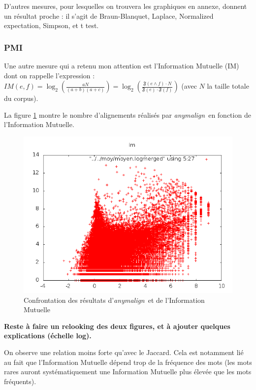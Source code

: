 \documentclass[a4paper,10pt]{article}
\newcommand{\anym}{\emph{anymalign}}
\begin{document}
D'autres mesures, pour lesquelles on trouvera les graphiques en annexe, donnent un résultat proche : il s'agit de Braun-Blanquet, Laplace, Normalized expectation, Simpson, et t test. %

\subsubsection{PMI}

Une autre mesure qui a retenu mon attention est l'Information Mutuelle (IM) %
 dont on rappelle l'expression : $IM(e,f)=\log_2\left(\frac{aN}{(a+b)(a+c)}\right)=\log_2\left(\frac{\mathfrak{F}(e\wedge f)\cdot N}{\mathfrak{F}(e)\cdot\mathfrak{F}(f)}\right)$ (avec $N$ la taille totale du corpus).

La figure \ref{im} montre le nombre d'alignements %
 réalisés par \anym~en fonction de l'Information Mutuelle.

\begin{figure}[t]
\centering
\includegraphics[width=12cm]{imlog.png} %
\caption{Confrontation des résultats d'\anym~et de l'Information Mutuelle}
\label{im}
\end{figure}

\textbf{Reste à faire un relooking des deux figures, et à ajouter quelques explications (échelle log).}

On observe une relation moins forte qu'avec le Jaccard. Cela est notamment lié au fait que l'Information Mutuelle dépend trop de la fréquence des mots (les mots rares auront systématiquement une Information Mutuelle plus élevée que les mots fréquents).
\end{document}
